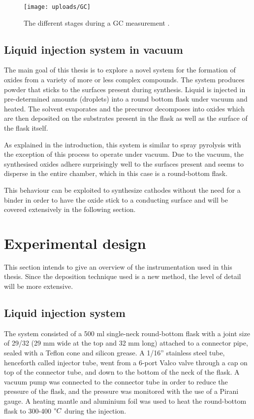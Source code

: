 \documentclass[Main/main.tex]{subfiles}
\begin{document}
\begin{figure}[ht]
    \centering
    \texttt{[image: uploads/GC]}
    \caption{The different stages during a GC measurement \cite{GC}.}
    \label{fig:GC}
\end{figure}


\section{Liquid injection system in vacuum}
The main goal of this thesis is to explore a novel system for the formation of oxides from a variety of more or less complex compounds. The system produces powder that sticks to the surfaces present during synthesis. Liquid is injected in pre-determined amounts (droplets) into a round bottom flask under vacuum and heated. The solvent evaporates and the precursor decomposes into oxides which are then deposited on the substrates present in the flask as well as the surface of the flask itself.

As explained in the introduction, this system is similar to spray pyrolysis with the exception of this process to operate under vacuum. Due to the vacuum, the synthesised oxides adhere surprisingly well to the surfaces present and seems to disperse in the entire chamber, which in this case is a round-bottom flask.

This behaviour can be exploited to synthesize cathodes without the need for a binder in order to have the oxide stick to a conducting surface and will be covered extensively in the following section.


\chapter{Experimental design}

This section intends to give an overview of the instrumentation used in this thesis. Since the deposition technique used is a new method, the level of detail will be more extensive.

\section{Liquid injection system} \label{liquid injection}
The system consisted of a 500 ml single-neck round-bottom flask with a joint size of 29/32 (29 mm wide at the top and 32 mm long) attached to a connector pipe, sealed with a Teflon cone  and silicon grease. A 1/16” stainless steel tube, henceforth called injector tube, went from a 6-port Valco valve through a cap on top of the connector tube, and down to the bottom of the neck of the flask. A vacuum pump was connected to the connector tube in order to reduce the pressure of the flask, and the pressure was monitored with the use of a Pirani gauge. A heating mantle and aluminium foil was used to heat the round-bottom flask to 300-400 $\degree C$ during the injection.
\end{document}
